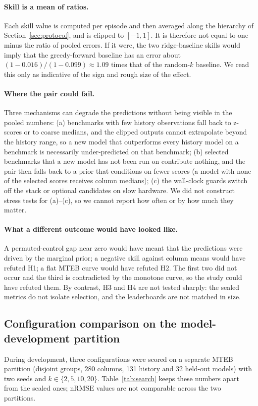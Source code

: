 \documentclass{article}
\newcommand{\nrmse}{\mathrm{nRMSE}}
\begin{document}
\paragraph{Skill is a mean of ratios.} Each skill value is computed per episode and then averaged along the hierarchy of Section~\ref{sec:protocol}, and is clipped to $[-1,1]$. It is therefore not equal to one minus the ratio of pooled errors. If it were, the two ridge-baseline skills would imply that the greedy-forward baseline has an error about $(1-0.016)/(1-0.099)\approx 1.09$ times that of the random-$k$ baseline. We read this only as indicative of the sign and rough size of the effect. %
\paragraph{Where the pair could fail.} Three mechanisms can degrade the predictions without being visible in the pooled numbers: (a) benchmarks with few history observations fall back to z-scores or to coarse medians, and the clipped outputs cannot extrapolate beyond the history range, so a new model that outperforms every history model on a benchmark is necessarily under-predicted on that benchmark; (b) selected benchmarks that a new model has not been run on contribute nothing, and the pair then falls back to a prior that conditions on fewer scores (a model with none of the selected scores receives column medians); (c) the wall-clock guards switch off the stack or optional candidates on slow hardware. We did not construct stress tests for (a)--(c), so we cannot report how often or by how much they matter.
\paragraph{What a different outcome would have looked like.} A permuted-control gap near zero would have meant that the predictions were driven by the marginal prior; a negative skill against column means would have refuted H1; a flat MTEB curve would have refuted H2. The first two did not occur and the third is contradicted by the monotone curve, so the study could have refuted them. By contrast, H3 and H4 are not tested sharply: the sealed metrics do not isolate selection, and the leaderboards are not matched in size.

\subsection{Configuration comparison on the model-development partition}\label{sec:search}
During development, three configurations were scored on a separate MTEB partition (disjoint groups, 280 columns, 131 history and 32 held-out models) with two seeds and $k\in\{2,5,10,20\}$. Table~\ref{tab:search} keeps these numbers apart from the sealed ones; $\nrmse$ values are not comparable across the two partitions.
\end{document}
